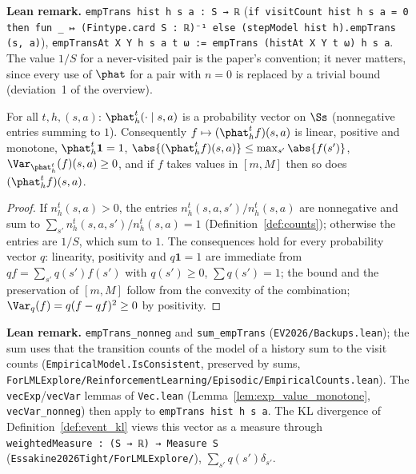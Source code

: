 \textbf{Lean remark.} \texttt{empTrans hist h s a : S → ℝ} (\texttt{if visitCount hist h s a = 0 then fun \_ ↦ (Fintype.card S : ℝ)⁻¹ else (stepModel hist h).empTrans (s, a)}),
\texttt{empTransAt X Y h s a t ω := empTrans (histAt X Y t ω) h s a}. The value $1/S$ for a
never-visited pair is the paper's convention; it never matters, since every use of $\phat$
for a pair with $n = 0$ is replaced by a trivial bound (deviation~1 of the overview).

\begin{lemma}\label{lem:emp_trans_simplex}
\leanok
{}
For all $t, h, (s, a)$: $\phat_h^t(\cdot \mid s, a)$ is a probability vector on $\Ss$
(nonnegative entries summing to $1$). Consequently $f \mapsto (\phat_h^t f)(s, a)$ is linear,
positive and monotone, $\phat_h^t \mathbf 1 = 1$, $\abs{(\phat_h^t f)(s, a)} \le \max_{s'} \abs{f(s')}$,
$\Var_{\phat_h^t}(f)(s, a) \ge 0$, and if $f$ takes values in $[m, M]$ then so does $(\phat_h^t f)(s, a)$.
\end{lemma}

\begin{proof}
\leanok
If $n_h^t(s, a) > 0$, the entries $n_h^t(s, a, s')/n_h^t(s, a)$ are nonnegative and sum to
$\sum_{s'} n_h^t(s, a, s')/n_h^t(s, a) = 1$ (Definition~\ref{def:counts}); otherwise the entries are
$1/S$, which sum to $1$. The consequences hold for every probability vector $q$: linearity,
positivity and $q \mathbf 1 = 1$ are immediate from $q f = \sum_{s'} q(s') f(s')$ with
$q(s') \ge 0$, $\sum q(s') = 1$; the bound and the preservation of $[m, M]$ follow from the
convexity of the combination; $\Var_q(f) = q(f - qf)^2 \ge 0$ by positivity.
\end{proof}

\textbf{Lean remark.} \texttt{empTrans\_nonneg} and \texttt{sum\_empTrans}
(\texttt{EV2026/Backups.lean}); the sum uses that the transition counts of the model of a history
sum to the visit counts (\texttt{EmpiricalModel.IsConsistent}, preserved by sums,
\texttt{ForLMLExplore/ReinforcementLearning/Episodic/EmpiricalCounts.lean}). The \texttt{vecExp}/\texttt{vecVar} lemmas of \texttt{Vec.lean}
(Lemma~\ref{lem:exp_value_monotone}, \texttt{vecVar\_nonneg}) then apply to
\texttt{empTrans hist h s a}. The KL divergence of Definition~\ref{def:event_kl} views this
vector as a measure through \texttt{weightedMeasure : (S → ℝ) → Measure S}
(\texttt{Essakine2026Tight/ForLMLExplore/}), $\sum_{s'} q(s') \delta_{s'}$.

